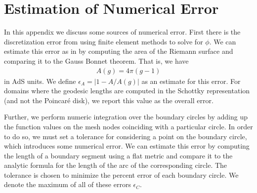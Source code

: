 \documentclass[letterpaper,12pt]{article}
\newcommand{\ban}[1]{\begin{align}#1\end{align}}
\begin{document}
\appendix





\section{Estimation of Numerical Error}
\label{appendix:error}

In this appendix we discuss some sources of numerical error. First there is the discretization error from using finite element methods to solve for $\phi$. We can estimate this error as in \cite{MRW} by computing the area of the Riemann surface and comparing it to the Gauss Bonnet theorem. That is, we have
\ban{
A(g) = 4 \pi (g-1) 	
}
in AdS units. We define $\epsilon_A = |1-A/A(g)|$ as an estimate for this error. For domains where the geodesic lengths are computed in the Schottky representation (and not the Poincar\'e disk), we report this value as the overall error.

Further, we perform numeric integration over the boundary circles by adding up the function values on the mesh nodes coinciding with a particular circle. In order to do so, we must set a tolerance for considering a point on the boundary circle, which introduces some numerical error. We can estimate this error by computing the length of a boundary segment using a flat metric and compare it to the analytic formula for the length of the arc of the corresponding circle. The tolerance is chosen to minimize the percent error of each boundary circle. We denote the maximum of all of these errors $\epsilon_C$.
\end{document}

